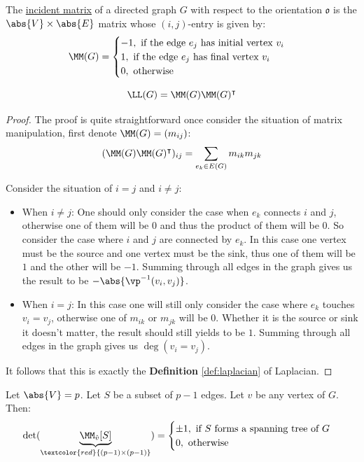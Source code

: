 \begin{definition}
	The \underline{incident matrix} of a directed graph \( G \) with respect to the orientation \( \mathfrak o \) is the \( \abs{V}\times \abs{E} \) matrix whose \( (i,j) \)-entry is given by:
	\[
		\MM(G) = \begin{cases}
			-1, \text{ if the edge }e_j \text{ has initial vertex } v_i \\
			1, \text{ if the edge } e_j \text{ has final vertex } v_i   \\
			0, \text{ otherwise}
		\end{cases}
	\]
\end{definition}

\begin{lemma}
	\leavevmode
	\[
		\LL(G) = \MM(G)\MM(G)^\intercal
	\]
\end{lemma}

\begin{proof}
	The proof is quite straightforward once consider the situation of matrix manipulation, first denote \( \MM(G) = (m_{ij}) \):
	\[
		(\MM(G)\MM(G)^\intercal)_{ij} = \sum_{e_k\in E(G)} m_{ik}m_{jk}
	\]

	Consider the situation of \( i=j \) and \( i\ne j \):
	\begin{itemize}
		\item When \( i\ne j \): One should only consider the case when \( e_k \) connects \( i \) and \( j \), otherwise one of them will be \( 0 \) and thus the product of them will be \( 0 \). So consider the case where \( i \) and \( j \) are connected by \( e_k \). In this case one vertex must be the source and one vertex must be the sink, thus one of them will be \( 1 \) and the other will be \( -1 \). Summing through all edges in the graph gives us the result to be \( -\abs{\vp^{-1}(v_i, v_j)} \).
		\item When \( i=j \): In this case one will still only consider the case where \( e_k \) touches \( v_i = v_j \), otherwise one of \( m_{ik} \) or \( m_{jk} \) will be \( 0 \). Whether it is the source or sink it doesn't matter, the result should still yields to be \( 1 \). Summing through all edges in the graph gives us \( \deg(v_i=v_j) \).
	\end{itemize}
	It follows that this is exactly the \textbf{Definition} \ref{def:laplacian} of Laplacian.
\end{proof}

\begin{lemma}
	\label{lem:count-spanning-tree}
	Let \( \abs{V} = p \). Let \( S \) be a subset of \( p-1 \) edges. Let \( v \) be any vertex of \( G \). Then:
	\[
		\det(\underbrace{\MM_{\hat{v}}[S]}_{\textcolor{red}{(p-1)\times(p-1)}}) = \begin{cases}
			\pm 1, \text{ if } S \text{ forms a spanning tree of } G \\
			0, \text{ otherwise}
		\end{cases}
	\]
\end{lemma}

